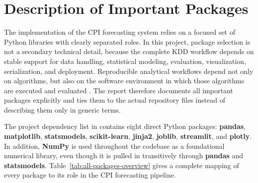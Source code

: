 %
%
%

\chapter{Description of Important Packages}
\label{ch:important-packages}

The implementation of the CPI forecasting system relies on a focused set of Python libraries with clearly separated roles. In this project, package selection is not a secondary technical detail, because the complete KDD workflow depends on stable support for data handling, statistical modeling, evaluation, visualization, serialization, and deployment. Reproducible analytical workflows depend not only on algorithms, but also on the software environment in which those algorithms are executed and evaluated \cite{Hyndman2021}. The report therefore documents all important packages explicitly and ties them to the actual repository files instead of describing them only in generic terms.

The project dependency list in  contains eight direct Python packages: \textbf{pandas}, \textbf{matplotlib}, \textbf{statsmodels}, \textbf{scikit-learn}, \textbf{jinja2}, \textbf{joblib}, \textbf{streamlit}, and \textbf{plotly}. In addition, \textbf{NumPy} is used throughout the codebase as a foundational numerical library, even though it is pulled in transitively through \textbf{pandas} and \textbf{statsmodels}. Table~\ref{tab:all-packages-overview} gives a complete mapping of every package to its role in the CPI forecasting pipeline.

